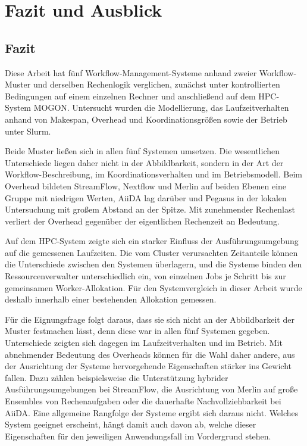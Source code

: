 
\chapter{Fazit und Ausblick}
\label{sec:conclusion}

\section{Fazit}
\label{sec:conclusion:fazit}

\begin{sloppypar}
Diese Arbeit hat fünf Workflow-Management-Systeme anhand zweier
Workflow-Muster und derselben Rechenlogik verglichen, zunächst
unter kontrollierten Bedingungen auf einem einzelnen Rechner und
anschließend auf dem HPC-System MOGON. Untersucht wurden die
Modellierung, das Laufzeitverhalten anhand von Makespan, Overhead
und Koordinationsgrößen sowie der Betrieb unter Slurm.
\end{sloppypar}

Beide Muster ließen sich in allen fünf Systemen umsetzen. Die
wesentlichen Unterschiede liegen daher nicht in der Abbildbarkeit,
sondern in der Art der Workflow-Beschreibung, im
Koordinationsverhalten und im Betriebsmodell. Beim Overhead
bildeten StreamFlow, Nextflow und Merlin auf beiden Ebenen eine
Gruppe mit niedrigen Werten, AiiDA lag darüber und Pegasus in der
lokalen Untersuchung mit großem Abstand an der Spitze. Mit zunehmender Rechenlast verliert der Overhead gegenüber der
eigentlichen Rechenzeit an Bedeutung.

Auf dem HPC-System zeigte sich ein starker Einfluss der
Ausführungsumgebung auf die gemessenen Laufzeiten. Die vom Cluster verursachten Zeitanteile können die Unterschiede zwischen den Systemen überlagern, und die Systeme binden den Ressourcenverwalter
unterschiedlich ein, von einzelnen Jobs je Schritt bis zur
gemeinsamen Worker-Allokation. Für den Systemvergleich in dieser Arbeit wurde deshalb innerhalb einer bestehenden Allokation gemessen.

Für die Eignungsfrage folgt daraus, dass sie sich nicht an der
Abbildbarkeit der Muster festmachen lässt, denn diese war in allen
fünf Systemen gegeben. Unterschiede zeigten sich dagegen im
Laufzeitverhalten und im Betrieb. Mit abnehmender Bedeutung des
Overheads können für die Wahl daher andere, aus der Ausrichtung der
Systeme hervorgehende Eigenschaften stärker ins Gewicht fallen.
Dazu zählen beispielsweise die Unterstützung hybrider
Ausführungsumgebungen bei StreamFlow, die Ausrichtung von Merlin
auf große Ensembles von Rechenaufgaben oder die dauerhafte
Nachvollziehbarkeit bei AiiDA. Eine allgemeine Rangfolge der
Systeme ergibt sich daraus nicht. Welches System geeignet
erscheint, hängt damit auch davon ab, welche dieser Eigenschaften
für den jeweiligen Anwendungsfall im Vordergrund stehen.

